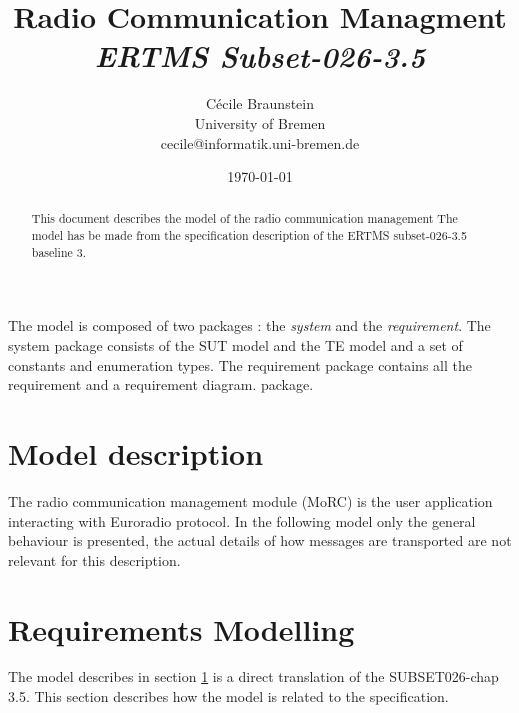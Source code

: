 \documentclass[11pt,notitlepage]{article}
\title{Radio Communication Managment \\
    {\it ERTMS Subset-026-3.5}}
\author{C{\'e}cile Braunstein\\University of Bremen\\
cecile@informatik.uni-bremen.de}
\date{\today}                                           %
\begin{document}
\maketitle

\begin{abstract}
This document describes the model of the radio communication management The
model has be made from the specification description of the ERTMS subset-026-3.5
baseline 3.
\end{abstract}
The model is composed of two packages : the \emph{system} and the
\emph{requirement}. The system package consists of the SUT model and the TE
model and a set of constants and enumeration types. The
requirement package contains all the requirement and a requirement diagram.
package.

\section{Model description}
\label{sec:modeldescription}
The radio communication management module (MoRC) is the user application interacting
with Euroradio protocol. In the following model only the general behaviour is
presented, the actual details of how messages are transported are not relevant
for this description.

\section{Requirements Modelling}
\label{sec:requirements}
The model describes in section \ref{sec:modeldescription} is a direct
translation of the SUBSET026-chap 3.5. This section describes how the model is
related to the specification.

%
\end{document}
